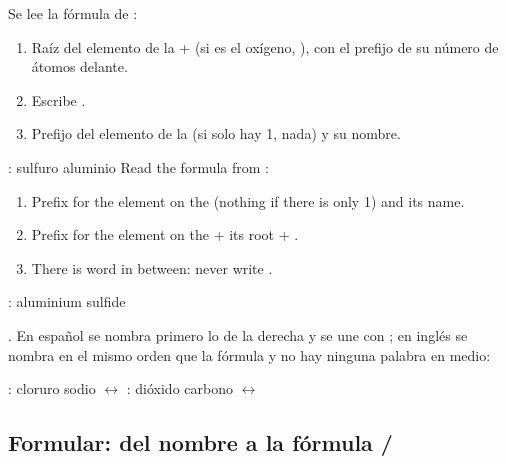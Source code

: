 \begin{reglas}
    Se lee la fórmula de :
    \begin{enumerate}[label=\numberballgreen]
        \item Raíz del elemento de la  +  (si es el oxígeno, ), con el prefijo de su número de átomos delante.
        \item Escribe .
        \item Prefijo del elemento de la  (si solo hay 1, nada) y su nombre.
    \end{enumerate}
    : sulfuro  aluminio
    \ingles
    Read the formula from :
    \begin{enumerate}[label=\numberballgreen]
        \item Prefix for the element on the  (nothing if there is only 1) and its name.
        \item Prefix for the element on the  + its root + .
        \item There is  word in between: never write .
    \end{enumerate}
    : aluminium sulfide
\end{reglas}





\begin{marker}
    . En español se nombra primero lo de la derecha y se une con ; en inglés se nombra en el mismo orden que la fórmula y no hay ninguna palabra en medio:
    \begin{center}
        : cloruro  sodio \(\leftrightarrow\)  \qquad {}: dióxido  carbono \(\leftrightarrow\) 
    \end{center}
\end{marker}

\subsection{Formular: del nombre a la fórmula / }

